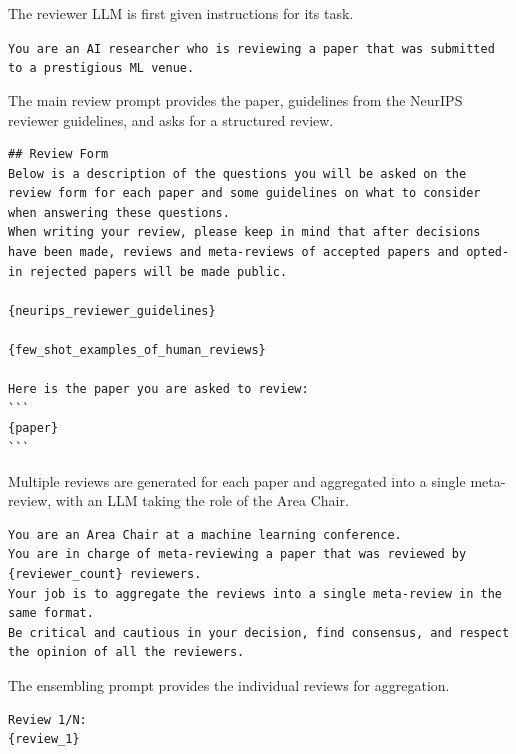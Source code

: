 \begin{appendices}
The reviewer LLM is first given instructions for its task.
\begin{tcolorbox}[breakable,colback=orange!5!white, colframe=orange!80!black, title=Paper Review System Prompt]
\texttt{You are an AI researcher who is reviewing a paper that was submitted to a prestigious ML venue.
}
\end{tcolorbox}

The main review prompt provides the paper, guidelines from the NeurIPS reviewer guidelines, and asks for a structured review.
\begin{tcolorbox}[breakable, colback=orange!5!white, colframe=orange!80!black, title=Paper Review Prompt]
\begin{Verbatim}[breaklines, breaksymbol={}, breaksymbolleft={}, fontsize=\small]
## Review Form
Below is a description of the questions you will be asked on the review form for each paper and some guidelines on what to consider when answering these questions.
When writing your review, please keep in mind that after decisions have been made, reviews and meta-reviews of accepted papers and opted-in rejected papers will be made public.

{neurips_reviewer_guidelines}

{few_shot_examples_of_human_reviews}

Here is the paper you are asked to review:
```
{paper}
```
\end{Verbatim}
\end{tcolorbox}


Multiple reviews are generated for each paper and aggregated into a single meta-review, with an LLM taking the role of the Area Chair.
\begin{tcolorbox}[breakable, colback=orange!5!white, colframe=orange!80!black, title=Paper Review Ensembling System Prompt]
\begin{Verbatim}[breaklines, breaksymbol={}, breaksymbolleft={}, fontsize=\small]
You are an Area Chair at a machine learning conference.
You are in charge of meta-reviewing a paper that was reviewed by {reviewer_count} reviewers.
Your job is to aggregate the reviews into a single meta-review in the same format.
Be critical and cautious in your decision, find consensus, and respect the opinion of all the reviewers.
\end{Verbatim}
\end{tcolorbox}

The ensembling prompt provides the individual reviews for aggregation.
\begin{tcolorbox}[breakable, colback=orange!5!white, colframe=orange!80!black, title=Paper Review Ensembling Prompt]
\begin{Verbatim}[breaklines, breaksymbol={}, breaksymbolleft={}, fontsize=\small]
Review 1/N:
{review_1}


\end{Verbatim}
\end{tcolorbox}
\end{appendices}
